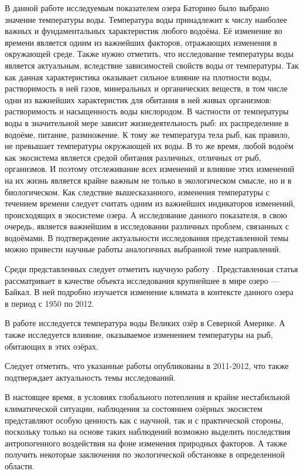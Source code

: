 В данной работе исследуемым показателем озера Баторино было выбрано значение температуры воды. Температура воды принадлежит к числу наиболее важных и фундаментальных характеристик любого водоёма. Её изменение во времени является одним из важнейших факторов, отражающих изменения в окружающей среде. Также нужно отметить, что исследование температуры воды является актуальным, вследствие зависимостей свойств воды от температуры. Так как данная характеристика оказывает сильное влияние на плотности воды, растворимость в ней газов, минеральных и органических веществ, в том числе одни из важнейших характеристик для обитания в ней живых организмов: растворимость и насыщенность воды кислородом. В частности от температуры воды в значительной мере зависит жизнедеятельность рыб: их распределение в водоёме, питание, размножение. К тому же температура тела рыб, как правило, не превышает температуры окружающей их воды. В то же время, любой водоём как экосистема является средой обитания различных, отличных от рыб, организмов. И поэтому отслеживание всех изменений и влияние этих изменений на их жизнь является крайне важным не только в экологическом смысле, но и в биологическом. Как следствие вышесказанного, изменения температуры с течением времени следует считать одним из важнейших индикаторов изменений, происходящих в экосистеме озера. А исследование данного показателя, в свою очередь, является важнейшим в исследовании различных проблем, связанных с водоёмами. В подтверждение актуальности исследования представленной темы можно привести научные работы \cite{Katz2011,OBrien2012a,Subehi2011} аналогичных выбранной теме направлений.

Среди представленных следует отметить научную работу \cite{Katz2011}. Представленная статья рассматривает в качестве объекта исследования крупнейшее в мире озеро --- Байкал. В ней подробно изучается изменение климата в контексте данного озера в период с 1950 по 2012.

В работе \cite{OBrien2012a} исследуется температура воды Великих озёр в Северной Америке. А также исследуется влияние, оказываемое изменением температуры на рыб, обитающих в этих озёрах.

Следует отметить, что указанные работы опубликованы в 2011-2012, что также подтверждает актуальность темы исследований.

В настоящее время, в условиях глобального потепления и крайне нестабильной климатической ситуации, наблюдения за состоянием озёрных экосистем представляют особую ценность как с научной, так и с практической стороны, поскольку только на основе таких наблюдений возможно выделить последствия антропогенного воздействия на фоне изменения природных факторов. А также получить некоторые заключения по экологической обстановке в определенной области.


